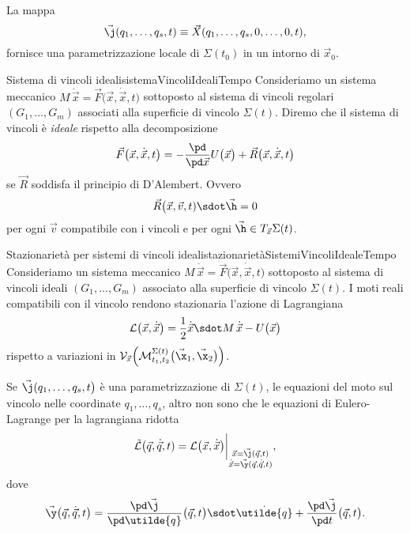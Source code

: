 \begin{oss}
	La mappa
	\[
		\vec{\j}(q_1,\ldots,q_s,t) \equiv \vec{X}(q_1,\ldots,q_s,0,\ldots,0,t),
	\]
	fornisce una parametrizzazione locale di \(\Sigma(t_0)\) in un intorno di \(\vec{x}_0\).
\end{oss}

\begin{defn}{Sistema di vincoli ideali}{sistemaVincoliIdealiTempo}
	Consideriamo un sistema meccanico \(M\,\ddot{\vec{x}}=\vec{F}\big(\vec{x},\dot{\vec{x}},t\big)\) sottoposto al sistema di vincoli regolari \((G_1,\ldots,G_m)\) associati alla superficie di vincolo \(\Sigma(t)\).
	Diremo che il sistema di vincoli è \emph{ideale} rispetto alla decomposizione
	\[
		\vec{F}\big(\vec{x},\dot{\vec{x}},t\big) = -\frac{\pd}{\pd\vec{x}}U\big(\vec{x}\big) + \vec{R}\big(\vec{x},\dot{\vec{x}},t\big)
	\]
	se \(\vec{R}\) soddisfa il principio di D'Alembert. Ovvero
	\[
		\vec{R}\big(\vec{x},\vec{v},t) \sdot \vec{\h} = 0
	\]
	per ogni \(\vec{v}\) compatibile con i vincoli e per ogni \(\vec{\h}\in T_{\vec{x}}\Sigma(t)\).
\end{defn}

\begin{teor}{Stazionarietà per sistemi di vincoli ideali}{stazionarietàSistemiVincoliIdealeTempo}
	Consideriamo un sistema meccanico \(M\,\ddot{\vec{x}}=\vec{F}\big(\vec{x},\dot{\vec{x}},t\big)\) sottoposto al sistema di vincoli ideali \((G_1,\ldots,G_m)\) associato alla superficie di vincolo \(\Sigma(t)\).
	I moti reali compatibili con il vincolo rendono stazionaria l'azione di Lagrangiana
	\[
		\mathcal{L}\big(\vec{x},\dot{\vec{x}}\big) = \frac{1}{2}\dot{\vec{x}} \sdot M\,\dot{\vec{x}} - U\big(\vec{x}\big)
	\]
	rispetto a variazioni in \(\mathcal{V}_{\vec{x}}\Big(\mathcal{M}_{t_1,t_2}^{\Sigma(t)}\big(\vec{\x}_1,\vec{\x}_2\big)\Big)\).
\end{teor}

\begin{oss}
	Se \(\vec{\j}(q_1,\ldots,q_s,t\big)\) è una parametrizzazione di \(\Sigma(t)\), le equazioni del moto sul vincolo nelle coordinate \(q_1,\ldots,q_s\), altro non sono che le equazioni di Eulero-Lagrange per la lagrangiana ridotta
	\[
		\tilde{\mathcal{L}}\big(\vec{q},\dot{\vec{q}},t) = \mathcal{L}\big(\vec{x},\dot{\vec{x}}\big)\bigg|_{\substack{\vec{x}=\vec{\j}(\vec{q},t)\\\dot{\vec{x}}=\vec{\y}(\vec{q},\dot{\vec{q}},t)}},
	\]
	dove
	\[
		\vec{\y}\big(\vec{q},\dot{\vec{q}},t\big) = \frac{\pd\vec{\j}}{\pd\utilde{q}}\big(\vec{q},t\big) \sdot \dot{\utilde{q}} + \frac{\pd\vec{\j}}{\pd t}\big(\vec{q},t\big).
	\]
\end{oss}

